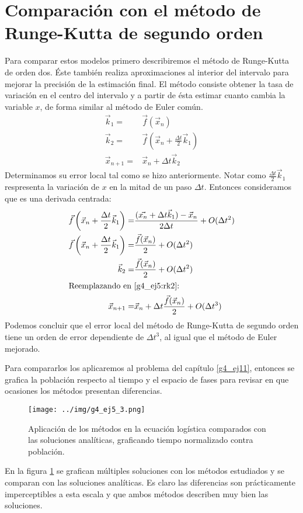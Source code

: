 \documentclass[../portafolio.tex]{subfiles}
\begin{document}
\section{Comparación con el método de Runge-Kutta de segundo orden}
Para comparar estos modelos primero describiremos el método de Runge-Kutta de orden dos. Éste también realiza aproximaciones al interior del intervalo para mejorar la precisión de la estimación final. El método consiste obtener la tasa de variación en el centro del intervalo y a partir de ésta estimar cuanto cambia la variable $x$, de forma similar al método de Euler común.
\begin{align}
\vec{k}_1=&\vec{f}(\vec{x}_n)\\
\vec{k}_2=&\vec{f}\left(\vec{x}_n+ \frac{\Delta t}{2}\vec{k}_1 \right)\\
\vec{x}_{n+1}=& \vec{x}_n + \Delta t \vec{k}_2 \label{g4_ej5:rk2}
\end{align}
Determinamos su error local tal como se hizo anteriormente. Notar como $\frac{\Delta t}{2}\vec{k}_1$ respresenta la variación de $x$ en la mitad de un paso $\Delta t$. Entonces consideramos que es una derivada centrada:
\begin{align}
\vec{f}\left(\vec{x}_n+ \frac{\Delta t}{2}\vec{k}_1 \right)=&\frac{(\vec{x_n}+\Delta t \vec{k}_1)-\vec{x}_n}{2\Delta t}+O(\Delta t^2)\\
\vec{f}\left(\vec{x}_n+ \frac{\Delta t}{2}\vec{k}_1 \right)=& \frac{\vec{f}(\vec{x}_n)}{2}+ O(\Delta t^2)\\
\vec{k}_2=& \frac{\vec{f}(\vec{x}_n)}{2}+ O(\Delta t^2)\\ \intertext{Reemplazando en \eqref{g4_ej5:rk2}:}
\vec{x}_{n+1}=& \vec{x}_n + \Delta t\frac{\vec{f}(\vec{x}_n)}{2}+ O(\Delta t^3)
\end{align}
Podemos concluir que el error local del método de Runge-Kutta de segundo orden tiene un orden de error dependiente de $\Delta t^3$, al igual que el método de Euler mejorado.

Para compararlos los aplicaremos al problema del capítulo \ref{g4_ej11}, entonces se grafica la población respecto al tiempo y el espacio de fases para revisar en que ocasiones los métodos presentan diferencias. 
\begin{figure}
\centering
\texttt{[image: ../img/g4\_ej5\_3.png]}
\caption{Aplicación de los métodos en la ecuación logística comparados con las soluciones analíticas, graficando tiempo normalizado contra población.}\label{g4_ej5:graf_ej5_tiempo}
\end{figure}
En la figura \ref{g4_ej5:graf_ej5_tiempo} se grafican múltiples soluciones con los métodos estudiados y se comparan con las soluciones analíticas. Es claro las diferencias son prácticamente imperceptibles a esta escala y que ambos métodos describen muy bien las soluciones.
\end{document}
